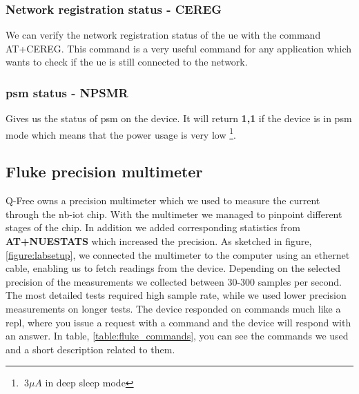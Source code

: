 \documentclass[USenglish]{ifimaster}  %
\begin{document}
\subsubsection{Network registration status - CEREG}
We can verify the network registration status of the \acrshort{ue} with the command AT+CEREG. This command is a very useful command for any application which wants to check if the \acrshort{ue} is still connected to the network.

\subsubsection{\acrshort{psm} status - NPSMR}
Gives us the status of \acrshort{psm} on the device. It will return \textbf{1,1} if the device is in \acrshort{psm} mode which means that the power usage is very low \footnote{${~3\mu A}$ in deep sleep mode}.

\subsection{Fluke precision multimeter}
Q-Free owns a precision multimeter which we used to measure the current through the \acrshort{nb-iot} chip. With the multimeter we managed to pinpoint different stages of the chip. In addition we added corresponding statistics from \textbf{AT+NUESTATS} which increased the precision. As sketched in figure, \vref{figure:labsetup}, we connected the multimeter to the computer using an ethernet cable, enabling us to fetch readings from the device.
Depending on the selected precision of the measurements we collected between 30-300 samples per second. The most detailed tests required high sample rate, while we used lower precision measurements on longer tests. The device responded on commands much like a \acrfull{repl}, where you issue a request with a command and the device will respond with an answer. In table, \vref{table:fluke_commands}, you can see the commands we used and a short description related to them.

\begin{table}[H]
\centering
{}
\caption{Fluke commands}
\label{table:fluke_commands}
\end{table}
\end{document}
